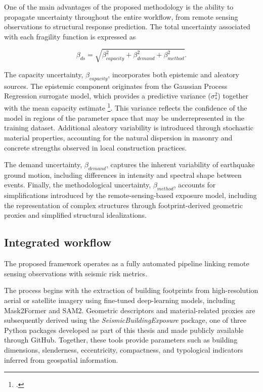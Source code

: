 \begin{refsection}
One of the main advantages of the proposed methodology is the ability to propagate uncertainty throughout the entire workflow, from remote sensing observations to structural response prediction. The total uncertainty associated with each fragility function is expressed as

\begin{equation}
    \beta_{ds}=
    \sqrt{
    \beta_{capacity}^{2}
    +
    \beta_{demand}^{2}
    +
    \beta_{method}^{2}
    }.
\end{equation}

The capacity uncertainty, $\beta_{capacity}$, incorporates both epistemic and aleatory sources. The epistemic component originates from the Gaussian Process Regression surrogate model, which provides a predictive variance ($\sigma_*^2$) together with the mean capacity estimate \footcite{rasmussen2003gaussian}. This variance reflects the confidence of the model in regions of the parameter space that may be underrepresented in the training dataset. Additional aleatory variability is introduced through stochastic material properties, accounting for the natural dispersion in masonry and concrete strengths observed in local construction practices.

The demand uncertainty, $\beta_{demand}$, captures the inherent variability of earthquake ground motion, including differences in intensity and spectral shape between events. Finally, the methodological uncertainty, $\beta_{method}$, accounts for simplifications introduced by the remote-sensing-based exposure model, including the representation of complex structures through footprint-derived geometric proxies and simplified structural idealizations.

\subsection{Integrated workflow}

The proposed framework operates as a fully automated pipeline linking remote sensing observations with seismic risk metrics.

The process begins with the extraction of building footprints from high-resolution aerial or satellite imagery using fine-tuned deep-learning models, including Mask2Former and SAM2. Geometric descriptors and material-related proxies are subsequently derived using the \textit{SeismicBuildingExposure} package, one of three Python packages developed as part of this thesis and made publicly available through GitHub. Together, these tools provide parameters such as building dimensions, slenderness, eccentricity, compactness, and typological indicators inferred from geospatial information.


\end{refsection}

